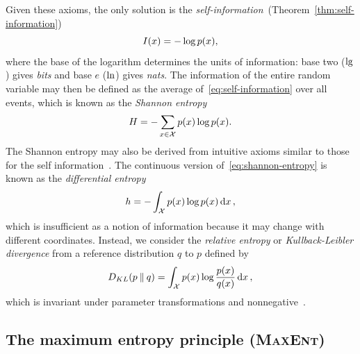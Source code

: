 \documentclass[aps,reprint,floatfix]{revtex4-2}
\renewcommand\mathrm\textnormal%
\theoremstyle{plain}
\theoremstyle{definition}
\renewcommand\ln{\operatorname{\mathrm{ln}}}
\renewcommand\lg{\operatorname{\mathrm{lg}}}
\renewcommand\log{\operatorname{\mathrm{log}}}
\begin{document}
Given these axioms, the only solution is the
\emph{self-information}~(Theorem~\ref{thm:self-information})
\begin{equation}
  I(x)
  = -\log p(x),
  \label{eq:self-information}
\end{equation}
where the base of the logarithm determines the units of information: base two
($\lg$) gives \emph{bits} and base $e$ ($\ln$) gives \emph{nats}. The
information of the entire random variable may then be defined as the average
of~\eqref{eq:self-information} over all events, which is known as the
\emph{Shannon entropy}
\begin{equation}
  H
  = -\sum_{x \in \mathcal{X}} p(x) \log p(x).
  \label{eq:shannon-entropy}
\end{equation}
The Shannon entropy may also be derived from intuitive axioms similar to those
for the self information~\cite{shannon1948mathematical,jaynes1957information}.
The continuous version of~\eqref{eq:shannon-entropy} is known as the
\emph{differential entropy}
\begin{equation}
  h
  = -\int_{\mathcal{X}} p(x) \log p(x) \dd{x},
  \label{eq:differential-entropy}
\end{equation}
which is insufficient as a notion of information because it may change with
different coordinates. Instead, we consider the \emph{relative entropy} or
\emph{Kullback-Leibler divergence} from a reference distribution $q$ to $p$
defined by
\begin{equation}
  D_{KL}(p \mathbin{\|} q)
  = \int_{\mathcal{X}} p(x) \log \frac{p(x)}{q(x)} \dd{x},
  \label{eq:kl-divergence}
\end{equation}
which is invariant under parameter transformations and
nonnegative~\cite[p.~243]{cover}.

\subsection{The maximum entropy principle (\textsc{MaxEnt})}\label{sec:maxent}
\end{document}
